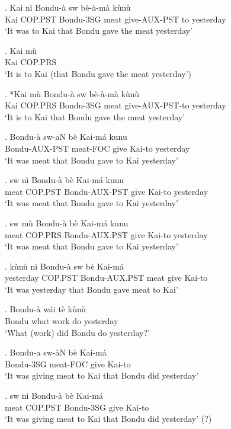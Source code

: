 \documentclass{assets/fieldnotes}
\begin{document}
\exg. Kai nì Bondu-à sw bè-à-mà kùnù\\
Kai COP.PST Bondu-3SG meat give-AUX-PST to yesterday\\
`It was to Kai that Bondu gave the meat yesterday'

\exg. Kai mù\\
Kai COP.PRS\\
`It is to Kai (that Bondu gave the meat yesterday')

\exg. *Kai mù Bondu-à sw bè-à-mà kùnù\\
Kai COP.PRS Bondu-3SG meat give-AUX-PST-to yesterday\\
`It is to Kai that Bondu gave the meat yesterday'

\exg. Bondu-à sw-aN bè Kai-má kunu\\
Bondu-AUX-PST meat-FOC give Kai-to yesterday\\
`It was meat that Bondu gave to Kai yesterday'

\exg. sw nì Bondu-à bè Kai-má kunu\\
meat COP.PST Bondu-AUX-PST give Kai-to yesterday\\
`It was meat that Bondu gave to Kai yesterday'

\exg. sw mù Bondu-à bè Kai-má kunu\\
meat COP.PRS Bondu-AUX.PST give Kai-to yesterday\\
`It was meat that Bondu gave to Kai yesterday'

\exg. kùnù nì Bondu-à sw bè Kai-má\\
yesterday COP.PST Bondu-AUX.PST meat give Kai-to\\
`It was yesterday that Bondu gave meat to Kai'

\exg. Bondu-à  wái tè kùnù\\
Bondu what work do yesterday\\
`What (work) did Bondu do yesterday?'

\exg. Bondu-a sw-àN bè Kai-má\\
Bondu-3SG meat-FOC give Kai-to\\
`It was giving meat to Kai that Bondu did yesterday'

\exg. sw nì Bondu-à bè Kai-má\\
meat COP.PST Bondu-3SG give Kai-to\\
`It was giving meat to Kai that Bondu did yesterday' (?)
\end{document}
